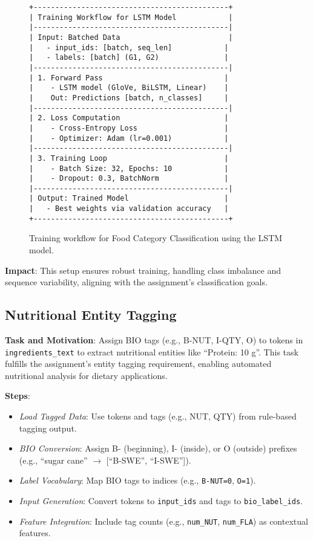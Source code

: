 \documentclass[11pt]{article}
\begin{document}
\begin{figure}[h]
\centering
\begin{lstlisting}[basicstyle=\ttfamily\scriptsize,breaklines=true,columns=flexible,frame=single,xleftmargin=0pt]
+---------------------------------------------+
| Training Workflow for LSTM Model            |
|---------------------------------------------|
| Input: Batched Data                         |
|   - input_ids: [batch, seq_len]            |
|   - labels: [batch] (G1, G2)               |
|---------------------------------------------|
| 1. Forward Pass                            |
|    - LSTM model (GloVe, BiLSTM, Linear)    |
|    Out: Predictions [batch, n_classes]     |
|---------------------------------------------|
| 2. Loss Computation                        |
|    - Cross-Entropy Loss                    |
|    - Optimizer: Adam (lr=0.001)            |
|---------------------------------------------|
| 3. Training Loop                           |
|    - Batch Size: 32, Epochs: 10            |
|    - Dropout: 0.3, BatchNorm               |
|---------------------------------------------|
| Output: Trained Model                      |
|   - Best weights via validation accuracy   |
+---------------------------------------------+
\end{lstlisting}
\caption{Training workflow for Food Category Classification using the LSTM model.}
\label{fig:training_workflow}
\end{figure}

\textbf{Impact}: This setup ensures robust training, handling class imbalance and sequence variability, aligning with the assignment’s classification goals.


\subsection{Nutritional Entity Tagging}

\textbf{Task and Motivation}: Assign BIO tags (e.g., B-NUT, I-QTY, O) to tokens in \texttt{ingredients\_text} to extract nutritional entities like ``Protein: 10 g''. This task fulfills the assignment’s entity tagging requirement, enabling automated nutritional analysis for dietary applications.

\textbf{Steps}:
\begin{itemize}[noitemsep]
    \item \textit{Load Tagged Data}: Use tokens and tags (e.g., NUT, QTY) from rule-based tagging output.
    \item \textit{BIO Conversion}: Assign B- (beginning), I- (inside), or O (outside) prefixes (e.g., ``sugar cane'' $\to$ [``B-SWE'', ``I-SWE'']).
    \item \textit{Label Vocabulary}: Map BIO tags to indices (e.g., \texttt{B-NUT=0}, \texttt{O=1}).
    \item \textit{Input Generation}: Convert tokens to \texttt{input\_ids} and tags to \texttt{bio\_label\_ids}.
    \item \textit{Feature Integration}: Include tag counts (e.g., \texttt{num\_NUT}, \texttt{num\_FLA}) as contextual features.
\end{itemize}
\end{document}
